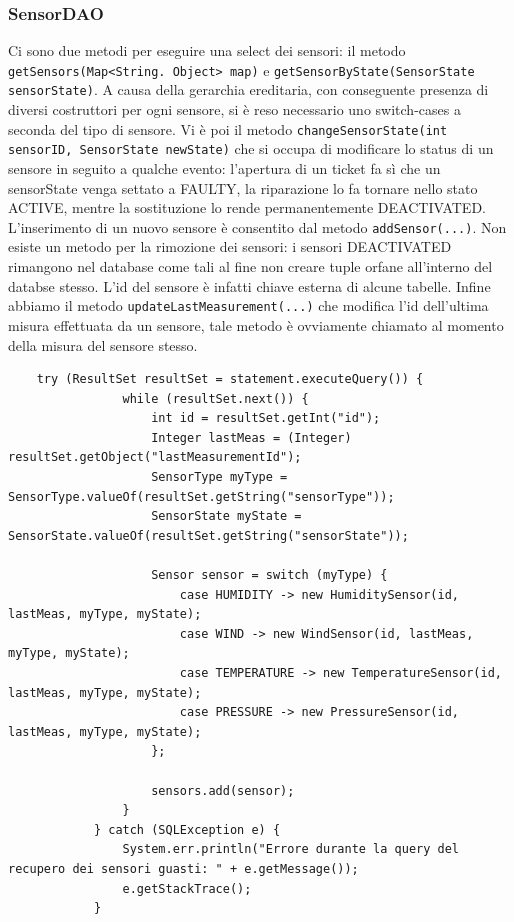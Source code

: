\documentclass[a4paper, 11pt]{article}
\begin{document}
	\subsubsection{SensorDAO}
	Ci sono due metodi per eseguire una select dei sensori: il metodo \texttt{getSensors(Map<String. Object> map)} e \texttt{getSensorByState(SensorState sensorState)}. A causa della gerarchia ereditaria, con conseguente presenza di diversi costruttori per ogni sensore, si è reso necessario uno switch-cases a seconda del tipo di sensore. Vi è poi il metodo \texttt{changeSensorState(int sensorID, SensorState newState)} che si occupa di modificare lo status di un sensore in seguito a qualche evento: l'apertura di un ticket fa sì che un sensorState venga settato a FAULTY, la riparazione lo fa tornare nello stato ACTIVE, mentre la sostituzione lo rende permanentemente DEACTIVATED. L'inserimento di un nuovo sensore è consentito dal metodo \texttt{addSensor(...)}. Non esiste un metodo per la rimozione dei sensori: i sensori DEACTIVATED rimangono nel database come tali al fine non creare tuple orfane all'interno del databse stesso. L'id del sensore è infatti chiave esterna di alcune tabelle. Infine abbiamo il metodo \texttt{updateLastMeasurement(...)} che modifica l'id dell'ultima misura effettuata da un sensore, tale metodo è ovviamente chiamato al momento della misura del sensore stesso.
	\begin{lstlisting}
    try (ResultSet resultSet = statement.executeQuery()) {
                while (resultSet.next()) {
                    int id = resultSet.getInt("id");
                    Integer lastMeas = (Integer) resultSet.getObject("lastMeasurementId");
                    SensorType myType = SensorType.valueOf(resultSet.getString("sensorType"));
                    SensorState myState = SensorState.valueOf(resultSet.getString("sensorState"));

                    Sensor sensor = switch (myType) {
                        case HUMIDITY -> new HumiditySensor(id, lastMeas, myType, myState);
                        case WIND -> new WindSensor(id, lastMeas, myType, myState);
                        case TEMPERATURE -> new TemperatureSensor(id, lastMeas, myType, myState);
                        case PRESSURE -> new PressureSensor(id, lastMeas, myType, myState);
                    };

                    sensors.add(sensor);
                }
            } catch (SQLException e) {
                System.err.println("Errore durante la query del recupero dei sensori guasti: " + e.getMessage());
                e.getStackTrace();
            }
	\end{lstlisting}
\end{document}
